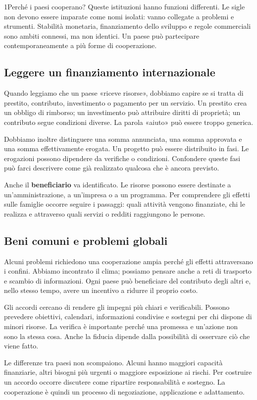 \begin{lettura}{1}{Perché i paesi cooperano?}
Queste istituzioni hanno funzioni differenti. Le sigle non devono essere imparate come nomi isolati: vanno collegate a problemi e strumenti. Stabilità monetaria, finanziamento dello sviluppo e regole commerciali sono ambiti connessi, ma non identici. Un paese può partecipare contemporaneamente a più forme di cooperazione.

\subsection*{Leggere un finanziamento internazionale}
Quando leggiamo che un paese «riceve risorse», dobbiamo capire se si tratta di prestito, contributo, investimento o pagamento per un servizio. Un prestito crea un obbligo di rimborso; un investimento può attribuire diritti di proprietà; un contributo segue condizioni diverse. La parola «aiuto» può essere troppo generica.

Dobbiamo inoltre distinguere una somma annunciata, una somma approvata e una somma effettivamente erogata. Un progetto può essere distribuito in fasi. Le erogazioni possono dipendere da verifiche o condizioni. Confondere queste fasi può farci descrivere come già realizzato qualcosa che è ancora previsto.

Anche il \textbf{beneficiario} va identificato. Le risorse possono essere destinate a un'amministrazione, a un'impresa o a un programma. Per comprendere gli effetti sulle famiglie occorre seguire i passaggi: quali attività vengono finanziate, chi le realizza e attraverso quali servizi o redditi raggiungono le persone.

\subsection*{Beni comuni e problemi globali}
Alcuni problemi richiedono una cooperazione ampia perché gli effetti attraversano i confini. Abbiamo incontrato il clima; possiamo pensare anche a reti di trasporto e scambio di informazioni. Ogni paese può beneficiare del contributo degli altri e, nello stesso tempo, avere un incentivo a ridurre il proprio costo.

Gli accordi cercano di rendere gli impegni più chiari e verificabili. Possono prevedere obiettivi, calendari, informazioni condivise e sostegni per chi dispone di minori risorse. La verifica è importante perché una promessa e un'azione non sono la stessa cosa. Anche la fiducia dipende dalla possibilità di osservare ciò che viene fatto.

Le differenze tra paesi non scompaiono. Alcuni hanno maggiori capacità finanziarie, altri bisogni più urgenti o maggiore esposizione ai rischi. Per costruire un accordo occorre discutere come ripartire responsabilità e sostegno. La cooperazione è quindi un processo di negoziazione, applicazione e adattamento.


\end{lettura}
